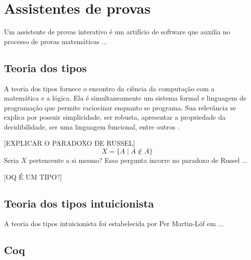 \chapter{Assistentes de provas}

Um assistente de provas interativo é um artifício de software que auxilia no processo de provas matemáticas ...

\section{Teoria dos tipos}

A teoria dos tipos fornece o encontro da ciência da computação com a matemática e a lógica. Ela é simultaneamente um sistema formal e linguagem de programação que permite raciocinar enquanto se programa. Sua relevância se explica por possuir simplicidade, ser robusta, apresentar a propriedade da decidibilidade, ser uma linguagem funcional, entre outros \cite{luo}.

[EXPLICAR O PARADOXO DE RUSSEL] $$X = \{ A \mid A \not\in A \}$$ Seria $X$ pertencente a si mesmo? Essa pergunta incorre no paradoxo de Russel ...

[OQ É UM TIPO?]

\section{Teoria dos tipos intuicionista}

A teoria dos tipos intuicionista foi estabelecida por Per Martin-Löf em ...


\section{Coq}

\cite{chlipala}